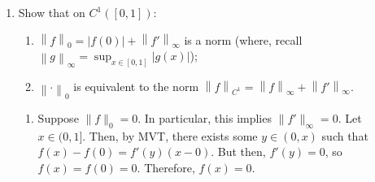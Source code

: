 \documentclass[11pt]{article}
\newcommand{\norm}[1]{\left\lVert #1 \right\rVert}
\begin{document}
\begin{enumerate}[label=\arabic*., leftmargin=*, itemsep=10pt]
\begin{enumerate}
        Suppose $z_n \to z$, where $z_n \in \ell_{c}$.
        We show $\lim_{j\to \infty}(z)_j = 0$.
        Let $\epsilon > 0$.
        Since $z_n \to z$, there exists some $n$ such that $\|z_n - z\| < \epsilon$.
        However, since $z_n \in \ell_{c}$, we have that there exists some $M$ such that $(z_n)_j = 0$ for all $j > M$.
        But then, for all $j > M$, $|(z)_j - (z_n)_j| = |(z)_j| < \|z_n - z\| < \epsilon$.
        Since we can findsuch an $M$ for any $\epsilon$, $\lim_{j \to \infty}(z)_j = 0$, so $z \in \ell_{0}$.

        Now, suppose $z \in \ell_{0}$, so $z = (x_1, x_2, \ldots)$, and define $z_n = (x_1, x_2, \ldots, x_n, 0, 0, \ldots)$.
        Then, $z - z_n = (0,\ldots,0, x_{n+1}, x_{n+2}, \ldots)$, so that $\|z - z_n\|_{\infty} = \sup_{j > n} |(z)_j| \to 0$ since $z \in \ell_{0}$.
        Therefore, $z_n \to z$.
        Thus, $\ell_0$ is the smallest closed set which contains $\ell_{c}$.
\end{enumerate}

\item Show that on $C^{1}([0,1])$:
\begin{enumerate}[label=(\alph*), itemsep=4pt]
\item $\norm{f}_0=|f(0)|+\norm{f'}_\infty$ is a norm (where, recall $\norm{g}_\infty=\sup_{x\in[0,1]}|g(x)|$);
\item $\norm{\cdot}_0$ is equivalent to the norm $\norm{f}_{C^1}=\norm{f}_\infty+\norm{f'}_\infty$.
\end{enumerate}


\begin{enumerate}
    \item Suppose $\|f\|_{0} = 0$.
        In particular, this implies $\|f'\|_{\infty} = 0$.
        Let $x \in (0, 1]$.
        Then, by MVT, there exists some $y \in (0, x)$ such that $f(x) - f(0) = f'(y)(x - 0)$.
        But then, $f'(y) = 0$, so $f(x) = f(0) = 0$.
        Therefore, $f(x) = 0$.


\end{enumerate}
\end{enumerate}
\end{document}
